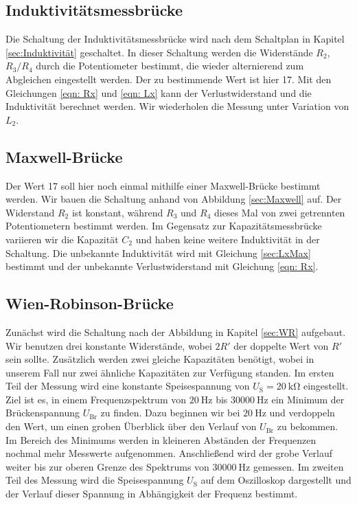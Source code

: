 \subsection{Induktivitätsmessbrücke}

    Die Schaltung der Induktivitätsmessbrücke wird nach dem Schaltplan in Kapitel \ref{sec:Induktivität} 
    geschaltet.
    In dieser Schaltung werden die Widerstände $R_2$, $R_3/R_4$ durch die Potentiometer bestimmt, die wieder 
    alternierend zum Abgleichen eingestellt werden.
    Der zu bestimmende Wert ist hier 17. 
    Mit den Gleichungen \eqref{eqn: Rx} und \eqref{eqn: Lx} kann der Verlustwiderstand und die Induktivität
    berechnet werden.
    Wir wiederholen die Messung unter Variation von $L_2$.

\subsection{Maxwell-Brücke}

    Der Wert 17 soll hier noch einmal mithilfe einer Maxwell-Brücke bestimmt werden.
    Wir bauen die Schaltung anhand von Abbildung \ref{sec:Maxwell} auf.
    Der Widerstand $R_2$ ist konstant, während $R_3$ und $R_4$ dieses Mal von zwei getrennten
    Potentiometern bestimmt werden.
    Im Gegensatz zur Kapazitätsmessbrücke variieren wir die Kapazität $C_2$ und haben keine weitere 
    Induktivität in der Schaltung.
    Die unbekannte Induktivität wird mit Gleichung \eqref{sec:LxMax} bestimmt und der unbekannte
    Verlustwiderstand mit Gleichung \eqref{eqn: Rx}.

\subsection{Wien-Robinson-Brücke}

    Zunächst wird die Schaltung nach der Abbildung in Kapitel \ref{sec:WR} aufgebaut.
    Wir benutzen drei konstante Widerstände, wobei $2R'$ der doppelte Wert von $R'$ sein sollte.
    Zusätzlich werden zwei gleiche Kapazitäten benötigt, wobei in unserem Fall nur zwei ähnliche Kapazitäten zur
    Verfügung standen.
    Im ersten Teil der Messung wird eine konstante Speisespannung von $U_\text{S} = \SI{20}{\kilo\ohm}$ eingestellt.
    Ziel ist es, in einem Frequenzspektrum von $\SI{20}{\hertz}$ bis $\SI{30000}{\hertz}$ ein 
    Minimum der Brückenspannung $U_\text{Br}$ zu finden.
    Dazu beginnen wir bei $\SI{20}{\hertz}$ und verdoppeln den Wert, um einen groben Überblick
    über den Verlauf von $U_\text{Br}$ zu bekommen. 
    Im Bereich des Minimums werden in kleineren Abständen der Frequenzen nochmal mehr Messwerte aufgenommen.
    Anschließend wird der grobe Verlauf weiter bis zur oberen Grenze des Spektrums von $\SI{30000}{\hertz}$ gemessen.
    Im zweiten Teil des Messung wird die Speisespannung $U_\text{S}$ auf dem Oszilloskop dargestellt 
    und der Verlauf dieser Spannung in Abhängigkeit der Frequenz bestimmt.
